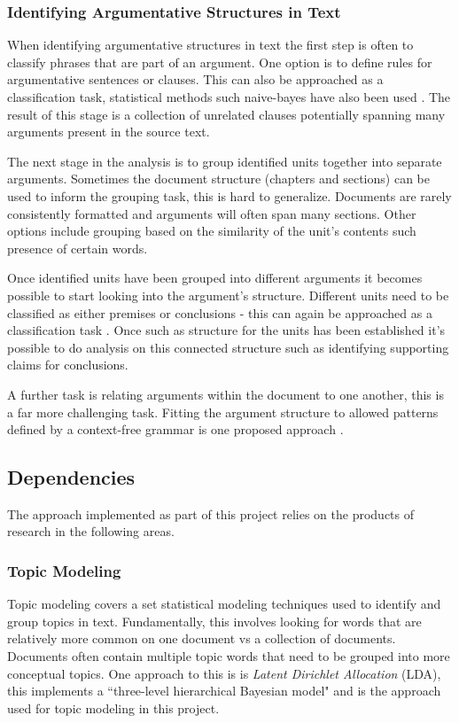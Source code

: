      \subsubsection{Identifying Argumentative Structures in Text}
        When identifying argumentative structures in text the first step is often to classify phrases that are part of an argument. One option is to define rules for argumentative sentences or clauses. This can also be approached as a classification task, statistical methods such naive-bayes have also been used \cite{palau2009argumentation}. The result of this stage is a collection of unrelated clauses potentially spanning many arguments present in the source text.

        The next stage in the analysis is to group identified units together into separate arguments. Sometimes the document structure (chapters and sections) can be used to inform the grouping task, this is hard to generalize. Documents are rarely consistently formatted and arguments will often span many sections. Other options include grouping based on the similarity of the unit's contents such presence of certain words. \cite{palau2009argumentation}

        Once identified units have been grouped into different arguments it becomes possible to start looking into the argument's structure. Different units need to be classified as either premises or conclusions - this can again be approached as a classification task \cite{palau2009argumentation}. Once such as structure for the units has been established it's possible to do analysis on this connected structure such as identifying supporting claims for conclusions.

        A further task is relating arguments within the document to one another, this is a far more challenging task. Fitting the argument structure to allowed patterns defined by a context-free grammar is one proposed approach \cite{palau2009argumentation}.

    \subsection{Dependencies}
      The approach implemented as part of this project relies on the products of research in the following areas.
      \subsubsection{Topic Modeling}
        Topic modeling covers a set statistical modeling techniques used to identify and group topics in text. Fundamentally, this involves looking for words that are relatively more common on one document vs a collection of documents. Documents often contain multiple topic words that need to be grouped into more conceptual topics. One approach to this is is \textit{Latent Dirichlet Allocation} (LDA), this implements a ``three-level hierarchical Bayesian model" \cite{blei2003latent} and is the approach used for topic modeling in this project.
